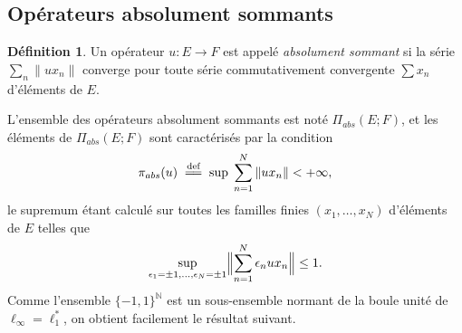 \documentclass{smfart}
\theoremstyle{plain}
\newtheorem{corollary}[theorem]{Corollaire}
\theoremstyle{definition}
\newtheorem{definition}[theorem]{Définition}
\newcommand\N{{\mathbb N}}
\newcommand {\defequal} {\; \overset{\text{def}}{=\joinrel=} \;}
\newcommand {\norm}[1] {\| #1 \|}               %
\newcommand {\Bignorm}[1]{\Bigl\| #1 \Bigr\|}
\newcommand {\ELL} {{\mathcal L}}
\begin{document}
% 
% 
% 
% 
% 




\subsection{Opérateurs absolument sommants}



\begin{definition}\label{def:abs-summing}
  Un opérateur $u:E\to F$ est appelé {\it absolument sommant} si la
  série $\sum_n \norm{ u x_n }$ converge pour toute série
  commutativement convergente $\sum x_n$  d'éléments de $E$.
\end{definition}

\noindent L'ensemble des opérateurs absolument sommants est noté
$\Pi_{abs}(E; F)$, et les éléments de $\Pi_{abs}(E; F)$ sont
caractérisés par la condition
\[
    \pi_{abs}(u) \defequal \sup \; \sum\limits_{n=1}^N  \left \Vert ux_n \right \Vert <+\infty,
\]
le supremum étant calculé sur toutes les familles finies
$(x_1,\dots,x_N)$ d'éléments de $E$ telles que
\[
\sup_{\epsilon_1=\pm 1, \dots, \epsilon_N=\pm 1}\Bignorm{ \sum  \limits _{n=1}^N \epsilon_nux_n } \le 1.
\]
Comme l'ensemble $\{-1,1\}^{\N}$ est un sous-ensemble normant de la
boule unité de $\ell_{\infty}=\ell_1^*$, on obtient facilement le
résultat suivant.
\end{document}
